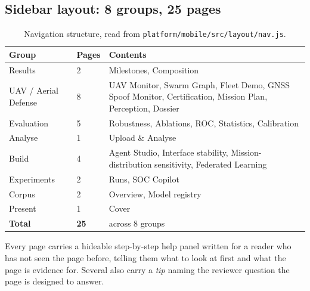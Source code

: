 \documentclass[11pt,a4paper]{article}
\newcommand{\code}[1]{\texttt{#1}}
\begin{document}
\subsection{Sidebar layout: 8 groups, 25 pages}
\begin{table}[H]
\centering\small
\begin{tabularx}{\linewidth}{@{}p{3.4cm}p{0.8cm}X@{}}
\toprule
\textbf{Group} & \textbf{Pages} & \textbf{Contents} \\
\midrule
Results & 2 & Milestones, Composition \\
UAV / Aerial Defense & 8 & UAV Monitor, Swarm Graph, Fleet Demo, GNSS Spoof Monitor, Certification, Mission Plan, Perception, Dossier \\
Evaluation & 5 & Robustness, Ablations, ROC, Statistics, Calibration \\
Analyse & 1 & Upload \& Analyse \\
Build & 4 & Agent Studio, Interface stability, Mission-distribution sensitivity, Federated Learning \\
Experiments & 2 & Runs, SOC Copilot \\
Corpus & 2 & Overview, Model registry \\
Present & 1 & Cover \\
\midrule
\textbf{Total} & \textbf{25} & across 8 groups \\
\bottomrule
\end{tabularx}
\caption{Navigation structure, read from \code{platform/mobile/src/layout/nav.js}.}
\end{table}

Every page carries a hideable step-by-step help panel written for a reader who
has not seen the page before, telling them what to look at first and what the
page is evidence for. Several also carry a \emph{tip} naming the reviewer
question the page is designed to answer.
\end{document}

